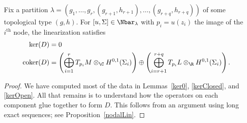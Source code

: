 \begin{proposition} \label{fiber}
Fix a partition $\lambda=(g_1,\ldots,g_r,(g_{r+1},h_{r+1}),\ldots,(g_{r+q},h_{r+q}))$ of some topological type $(g,h)$. For $[u,\Sigma] \in \Nbar_\lambda$ with $p_i=u(z_i)$ the image of the $i^{\text{th}}$ node, the linearization satisfies
\begin{align*}
\ker(D) & = 0
\\
\coker(D) & = \left( \bigoplus\limits_{i=1}^r T_{p_i}M \otimes_\C H^{0,1}(\Sigma_i) \right) \oplus \left( \bigoplus\limits_{i=r+1}^{r+q} T_{p_i}L \otimes_\R H^{0,1}(\Sigma_i) \right).
\end{align*}
\begin{proof}
We have computed most of the data in Lemmas~\ref{ker0}, \ref{kerClosed}, and \ref{kerOpen}. All that remains is to understand how the operators on each component glue together to form $D$. This follows from an argument using long exact sequences; see Proposition~\ref{nodalLin}.
\end{proof}
\end{proposition}

